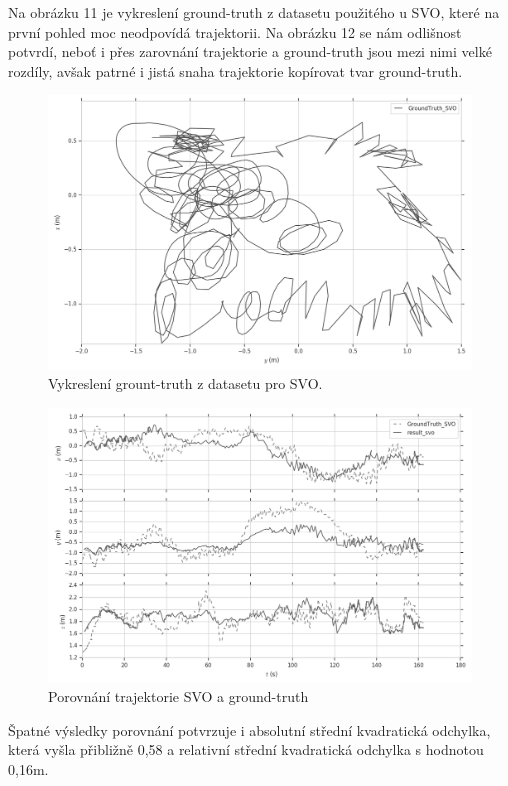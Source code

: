 \documentclass[12pt,a4paper]{report}
\begin{document}
Na obrázku 11 je vykreslení ground-truth z datasetu použitého u SVO, které na první pohled moc neodpovídá trajektorii. Na obrázku 12 se nám odlišnost potvrdí, neboť i přes zarovnání trajektorie a ground-truth jsou mezi nimi velké rozdíly, avšak patrné i jistá snaha trajektorie kopírovat tvar ground-truth.

\begin{figure}[H]
\centering
\includegraphics[scale=0.5]{img/xy_SVO_gt.png}
\caption{Vykreslení grount-truth z datasetu pro SVO.}
\end{figure}

\begin{figure}[H]
\centering
\includegraphics[scale=0.5]{img/xyz_SVO.png}
\caption{Porovnání trajektorie SVO a ground-truth}
\end{figure} 

Špatné výsledky porovnání potvrzuje i absolutní střední kvadratická odchylka, která vyšla přibližně 0,58 a relativní střední kvadratická odchylka s hodnotou 0,16m.
\end{document}
